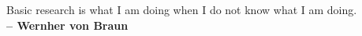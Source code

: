 \newpage
\begin{flushright}
	Basic research is what I am doing when I do not know what I am doing.\\
    \textbf{-- Wernher von Braun}
\end{flushright}


\normalsize
\libertineNormal

\lipsum[1-6]

